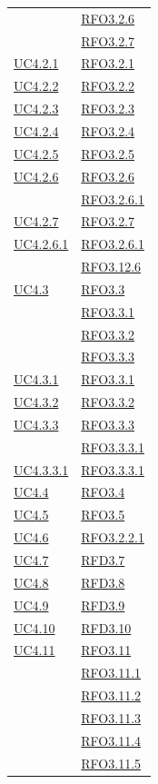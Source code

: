 \begin{longtable}{|>{\centering}m{5cm}|m{5cm}<{\centering}|}
& \hyperlink{RFO3.2.6}{RFO3.2.6}\\ 
& \hyperlink{RFO3.2.7}{RFO3.2.7}\\ \hline
\hyperref[UC4.2.1]{UC4.2.1} & \hyperlink{RFO3.2.1}{RFO3.2.1}\\ \hline
\hyperref[UC4.2.2]{UC4.2.2} & \hyperlink{RFO3.2.2}{RFO3.2.2}\\ \hline
\hyperref[UC4.2.3]{UC4.2.3} & \hyperlink{RFO3.2.3}{RFO3.2.3}\\ \hline
\hyperref[UC4.2.4]{UC4.2.4} & \hyperlink{RFO3.2.4}{RFO3.2.4}\\ \hline
\hyperref[UC4.2.5]{UC4.2.5} & \hyperlink{RFO3.2.5}{RFO3.2.5}\\ \hline
\hyperref[UC4.2.6]{UC4.2.6} & \hyperlink{RFO3.2.6}{RFO3.2.6}\\
& \hyperlink{RFO3.2.6.1}{RFO3.2.6.1}\\ \hline
\hyperref[UC4.2.7]{UC4.2.7} & \hyperlink{RFO3.2.7}{RFO3.2.7}\\ \hline
\hyperref[UC4.2.6.1]{UC4.2.6.1} & \hyperlink{RFO3.2.6.1}{RFO3.2.6.1}\\ & \hyperlink{RFO3.12.6}{RFO3.12.6}\\ \hline
\hyperref[UC4.3]{UC4.3} & \hyperlink{RFO3.3}{RFO3.3}\\
& \hyperlink{RFO3.3.1}{RFO3.3.1}\\
& \hyperlink{RFO3.3.2}{RFO3.3.2}\\
& \hyperlink{RFO3.3.3}{RFO3.3.3}\\ \hline
\hyperref[UC4.3.1]{UC4.3.1} & \hyperlink{RFO3.3.1}{RFO3.3.1}\\ \hline
\hyperref[UC4.3.2]{UC4.3.2} & \hyperlink{RFO3.3.2}{RFO3.3.2}\\ \hline
\hyperref[UC4.3.3]{UC4.3.3} & \hyperlink{RFO3.3.3}{RFO3.3.3}\\
& \hyperlink{RFO3.3.3.1}{RFO3.3.3.1}\\ \hline
\hyperref[UC4.3.3.1]{UC4.3.3.1} & \hyperlink{RFO3.3.3.1}{RFO3.3.3.1}\\ \hline
\hyperref[UC4.4]{UC4.4} & \hyperlink{RFO3.4}{RFO3.4}\\ \hline
\hyperref[UC4.5]{UC4.5} & \hyperlink{RFO3.5}{RFO3.5}\\ \hline
\hyperref[UC4.6]{UC4.6} & \hyperlink{RFO3.2.2.1}{RFO3.2.2.1}\\ \hline
\hyperref[UC4.7]{UC4.7} & \hyperlink{RFD3.7}{RFD3.7}\\ \hline
\hyperref[UC4.8]{UC4.8} & \hyperlink{RFD3.8}{RFD3.8}\\ \hline
\hyperref[UC4.9]{UC4.9} & \hyperlink{RFD3.9}{RFD3.9}\\ \hline
\hyperref[UC4.10]{UC4.10} & \hyperlink{RFD3.10}{RFD3.10}\\ \hline
\hyperref[UC4.11]{UC4.11} & \hyperlink{RFO3.11}{RFO3.11}\\
& \hyperlink{RFO3.11.1}{RFO3.11.1}\\ 
& \hyperlink{RFO3.11.2}{RFO3.11.2}\\
& \hyperlink{RFO3.11.3}{RFO3.11.3}\\
& \hyperlink{RFO3.11.4}{RFO3.11.4}\\
& \hyperlink{RFO3.11.5}{RFO3.11.5}\\\hline


\end{longtable}
